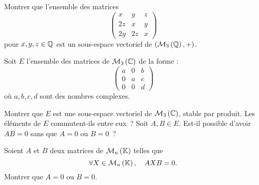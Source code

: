 \documentclass{magnolia}
\begin{document}


Montrer que l'ensemble des matrices
\[\begin{pmatrix}
  x   & y  & z\\
  2z  & x  & y\\ 
  2y  & 2z & x
  \end{pmatrix}\]
pour $x,y,z \in \mathbb{Q}$ est un sous-espace vectoriel de $(\mathcal{M}_{3}\left(\mathbb{Q}\right),+)$.




Soit $E$ l'ensemble des matrices de $\mathcal{M}_{3}\left(\mathbb{C}\right)$ de la forme :
\[\begin{pmatrix}
    a & 0 & b\\
    0 & a & c\\
    0 & 0 & d
    \end{pmatrix}\]
où $a,b,c,d$ sont des nombres complexes.
\begin{questions}
\question Montrer que $E$ est une sous-espace vectoriel de $\mathcal{M}_{3}\left(\mathbb{C}\right)$, stable par produit.
\question Les éléments de $E$ commutent-ils entre eux~?
\question Soit $A,B\in E$. Est-il possible d'avoir $AB=0$ sans que $A=0$ ou
  $B=0$~?
\end{questions}


Soient $A$ et $B$ deux matrices de $\mathcal{M}_{n}\left(\mathbb{K}\right)$ telles que
\[\forall X\in\mathcal{M}_{n}\left(\mathbb{K}\right) ,\quad AXB=0.\]
Montrer que $A=0$ ou $B=0$.


\end{document}
